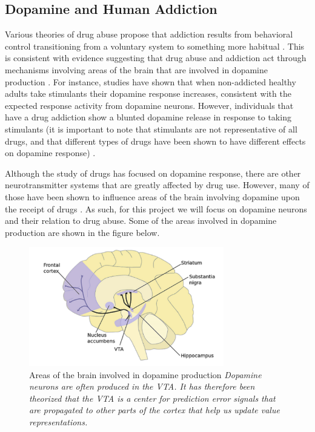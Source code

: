 \documentclass[10pt,letterpaper]{article}
\begin{document}
\subsection{Dopamine and Human Addiction}
Various theories of drug abuse propose that addiction results from behavioral control transitioning from a voluntary system to something more habitual \cite{RobbinsEveritt1999, Tiffany1990}. This is consistent with evidence suggesting that drug abuse and addiction act through mechanisms involving areas of the brain that are involved in dopamine production \cite{RobbinsEveritt1999, WiseBozarth1987}. For instance, studies have shown that when non-addicted healthy adults take stimulants their dopamine response increases, consistent with the expected response activity from dopamine neurons. However, individuals that have a drug addiction show a blunted dopamine release in response to taking stimulants (it is important to note that stimulants are not representative of all drugs, and that different types of drugs have been shown to have different effects on dopamine response) \cite{Nuttetal2015}. 

Although the study of drugs has focused on dopamine response, there are other neurotransmitter systems that are greatly affected by drug use. However, many of those have been shown to influence areas of the brain involving dopamine upon the receipt of drugs \cite{WiseBozarth1987}. As such, for this project we will focus on dopamine neurons and their relation to drug abuse. Some of the areas involved in dopamine production are shown in the figure below.

\begin{figure}[H]
   \centering
    \includegraphics[width = 85mm]{graphs/brain.png}
    \caption{Areas of the brain involved in dopamine production
    \newline \emph{Dopamine neurons are often produced in the VTA. It has therefore been theorized that the VTA is a center for prediction error signals that are propagated to other parts of the cortex that help us update value representations.}}
    \label{fig:Dopamine Brain}
\end{figure}
\end{document}
